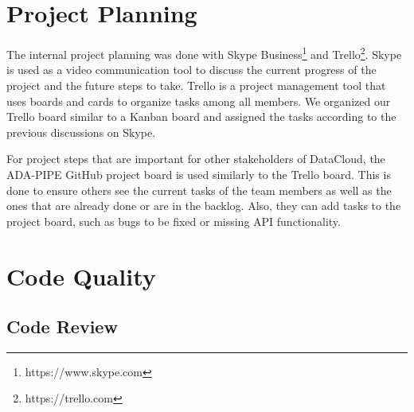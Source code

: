 \documentclass{article}
\begin{document}
    \section{Project Planning}
    \label{sec:project-planning}

        The internal project planning was done with Skype Business\footnote{https://www.skype.com} and Trello\footnote{https://trello.com}.
        Skype is used as a video communication tool to discuss the current progress of the project and the future steps to take.
        Trello is a project management tool that uses boards and cards to organize tasks among all members.
        We organized our Trello board similar to a Kanban board and assigned the tasks according to the previous discussions on Skype.
        
        For project steps that are important for other stakeholders of DataCloud, the ADA-PIPE GitHub project board is used similarly to the Trello board. This is done to ensure others see the current tasks of the team members as well as the ones that are already done or are in the backlog. Also, they can add tasks to the project board, such as bugs to be fixed or missing API functionality.
        
    \section{Code Quality}
    \label{sec:code-quality}


        \subsection{Code Review}
        \label{sec:code-review-code-quality}
\end{document}
